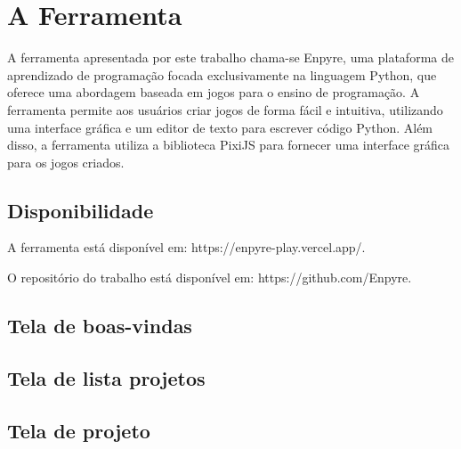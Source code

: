 \section{A Ferramenta}

A ferramenta apresentada por este trabalho chama-se Enpyre, uma plataforma de aprendizado de programação focada exclusivamente na linguagem Python, que oferece uma abordagem baseada em jogos para o ensino de programação. A ferramenta permite aos usuários criar jogos de forma fácil e intuitiva, utilizando uma interface gráfica e um editor de texto para escrever código Python. Além disso, a ferramenta utiliza a biblioteca PixiJS para fornecer uma interface gráfica para os jogos criados.

\subsection{Disponibilidade}

A ferramenta está disponível em: https://enpyre-play.vercel.app/.

O repositório do trabalho está disponível em: https://github.com/Enpyre.

\subsection{Tela de boas-vindas}

\subsection{Tela de lista projetos}

\subsection{Tela de projeto}